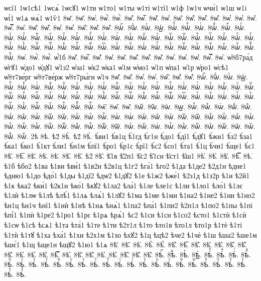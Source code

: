{ѡсї1
1ѡ1сѣ1
1ѡсѧ́
1ѡсꙋ1
ѡ1ти
ѡ1то1
ѡ1ты
ѡ1ті
ѡ1тї1
ѡ1ф
1ѡ1ч
ѡчи́1
ѡ1ш
ѡ1і
ѡі́1
ѡ1ѧ
ѡѧ́1
ѡ1ѷ1
8ѡ҃.
8ѡ҄.
8ѡ҅.
8ѡ҅̀.
8ѡ҅́.
8ѡ҅̂.
8ѡ҅̅.
8ѡ҅̆.
8ѡ҅̇.
8ѡ҅̈.
8ѡ҅̋.
8ѡ҅̏.
8ѡ҅̑.
8ѡ҅̓.
8ѡ҅̔.
8ѡ҅̾.
8ѡ҅̿.
8ѡ҅͘.
8ѡ҅҃.
8ѡ҅҄.
8ѡ҅҅.
8ѡ҅҆.
8ѡ҅҇.
8ѡ҅᷀.
8ѡ҅᷁.
8ѡ҅᷶.
8ѡ᷷҅.
8ѡ᷸҅.
8ѡ᷹҅.
8ѡ҅ⷠ.
8ѡ҅ⷡ.
8ѡ҅ⷢ.
8ѡ҅ⷣ.
8ѡ҅ⷤ.
8ѡ҅ⷥ.
8ѡ҅ⷦ.
8ѡ҅ⷧ.
8ѡ҅ⷨ.
8ѡ҅ⷩ.
8ѡ҅ⷪ.
8ѡ҅ⷫ.
8ѡ҅ⷬ.
8ѡ҅ⷭ.
8ѡ҅ⷮ.
8ѡ҅ⷯ.
8ѡ҅ⷰ.
8ѡ҅ⷱ.
8ѡ҅ⷲ.
8ѡ҅ⷳ.
8ѡ҅ⷴ.
8ѡ҅ⷵ.
8ѡ҅ⷶ.
8ѡ҅ⷷ.
8ѡ҅ⷸ.
8ѡ҅ⷹ.
8ѡ҅ⷺ.
8ѡ҅ⷻ.
8ѡ҅ⷼ.
8ѡ҅ⷽ.
8ѡ҅ⷾ.
8ѡ҅ⷿ.
8ѡ҅꙯.
8ѡ҅ꙴ.
8ѡ҅ꙵ.
8ѡ҅ꙶ.
8ѡ҅ꙷ.
8ѡ҅ꙸ.
8ѡ҅ꙹ.
8ѡ҅ꙺ.
8ѡ҅ꙻ.
8ѡ҅꙼.
8ѡ҅꙽.
8ѡ҅ꚞ.
8ѡ҅ꚟ.
8ѡ҆.
8ѡ҆̀.
8ѡ҆́.
ѡ҆́1б
8ѡ҆̂.
8ѡ҆̅.
8ѡ҆̆.
8ѡ҆̇.
8ѡ҆̈.
8ѡ҆̋.
8ѡ҆̏.
8ѡ҆̑.
8ѡ҆̓.
8ѡ҆̔.
8ѡ҆̾.
8ѡ҆̿.
8ѡ҆͘.
ѡ҆8б7ра́д
ѡ҆гꙋ1
ѡ҆до1
ѡ҆дꙋ1
ѡ҆1з2
ѡ҆за1
ѡ҆к2
ѡ҆ка1
ѡ҆1м
ѡ҆мо1
ѡ҆1п
ѡ҆па1
ѡ҆1р
ѡ҆ро1
ѡ҆сѣ1
ѡ҆8т7ве́рг
ѡ҆8т7ве́рж
ѡ҆8т7ры́гн
ѡ҆1ч
8ѡ҆҃.
8ѡ҆҄.
8ѡ҆҅.
8ѡ҆҆.
8ѡ҆҇.
8ѡ҆᷀.
8ѡ҆᷁.
8ѡ҆᷶.
8ѡ᷷҆.
8ѡ᷸҆.
8ѡ᷹҆.
8ѡ҆ⷠ.
8ѡ҆ⷡ.
8ѡ҆ⷢ.
8ѡ҆ⷣ.
8ѡ҆ⷤ.
8ѡ҆ⷥ.
8ѡ҆ⷦ.
8ѡ҆ⷧ.
8ѡ҆ⷨ.
8ѡ҆ⷩ.
8ѡ҆ⷪ.
8ѡ҆ⷫ.
8ѡ҆ⷬ.
8ѡ҆ⷭ.
8ѡ҆ⷮ.
8ѡ҆ⷯ.
8ѡ҆ⷰ.
8ѡ҆ⷱ.
8ѡ҆ⷲ.
8ѡ҆ⷳ.
8ѡ҆ⷴ.
8ѡ҆ⷵ.
8ѡ҆ⷶ.
8ѡ҆ⷷ.
8ѡ҆ⷸ.
8ѡ҆ⷹ.
8ѡ҆ⷺ.
8ѡ҆ⷻ.
8ѡ҆ⷼ.
8ѡ҆ⷽ.
8ѡ҆ⷾ.
8ѡ҆ⷿ.
8ѡ҆꙯.
8ѡ҆ꙴ.
8ѡ҆ꙵ.
8ѡ҆ꙶ.
8ѡ҆ꙷ.
8ѡ҆ꙸ.
8ѡ҆ꙹ.
8ѡ҆ꙺ.
8ѡ҆ꙻ.
8ѡ҆꙼.
8ѡ҆꙽.
8ѡ҆ꚞ.
8ѡ҆ꚟ.
8ѡ҇.
8ѡ᷀.
8ѡ᷁.
8ѡ᷶.
8ѡ᷷.
8ѡ᷸.
8ѡ᷹.
8ѡⷠ.
8ѡⷡ.
8ѡⷢ.
8ѡⷣ.
8ѡⷤ.
8ѡⷥ.
8ѡⷦ.
8ѡⷧ.
8ѡⷨ.
8ѡⷩ.
8ѡⷪ.
8ѡⷫ.
8ѡⷬ.
8ѡⷭ.
8ѡⷮ.
8ѡⷯ.
8ѡⷰ.
8ѡⷱ.
8ѡⷲ.
8ѡⷳ.
8ѡⷴ.
8ѡⷵ.
8ѡⷶ.
8ѡⷷ.
8ѡⷸ.
8ѡⷹ.
8ѡⷺ.
8ѡⷻ.
8ѡⷼ.
8ѡⷽ.
8ѡⷾ.
8ѡⷿ.
8ѡ꙯.
8ѡꙴ.
8ѡꙵ.
8ѡꙶ.
8ѡꙷ.
8ѡꙸ.
8ѡꙹ.
8ѡꙺ.
8ѡꙻ.
8ѡ꙼.
8ѡ꙽.
8ѡꚞ.
8ѡꚟ.
2ѣ
8ѣ.
ѣ2̀
8ѣ̀.
ѣ2́
8ѣ́.
ѣ́ви1
ѣ́в1ц
ѣ́1гд
ѣ́г1н
ѣ́до1
ѣ́дї1
ѣ́дꙋ1
ѣ́жи1
ѣ́з2
ѣ́за1
ѣ́ка1
ѣ́ко1
ѣ́1кт
ѣ́ли1
ѣ́н1м
ѣ́пї1
ѣ́ро1
ѣ́р1с
ѣ́рї1
ѣ́с2
ѣ́со1
ѣ́та1
ѣ́1ц
ѣ́чи1
ѣ́ще1
ѣ́є1
8ѣ̂.
8ѣ̅.
8ѣ̆.
8ѣ̇.
8ѣ̈.
8ѣ̋.
8ѣ̏.
ѣ2̑
8ѣ̑.
ѣ̑1в
ѣ̑2п1
ѣ̑с2
ѣ̑1сн
ѣ̑ст1
ѣ̑ш1
8ѣ̓.
8ѣ̔.
8ѣ̾.
8ѣ̿.
8ѣ͘.
ѣ1б
ѣбо2
ѣ1ва
ѣ1ви
ѣви́1
ѣ1в2н
ѣ2в1ц
ѣ1г2
ѣга́1
ѣго2
ѣ1да
ѣ1де2
ѣ2д1н
ѣдне1
ѣдню1
ѣ1до
ѣдо́1
ѣ1ды
ѣ1дї2
ѣдѡ2
ѣ1дꙋ2
ѣ1е
ѣ1ж2
ѣже́1
ѣ2з1д
ѣ1з2р
ѣ1и
ѣ2й1
ѣ1к
ѣка2
ѣки́1
ѣ2к1н
ѣко́1
ѣкꙋ2
ѣ1ла2
ѣла́1
ѣ1ле
ѣле1с
ѣ1ли
ѣ1ло1
ѣло́1
ѣ1лє
ѣ1лѝ
ѣ1лѡ
ѣ1лѣ
ѣлѣ́1
ѣ1лѧ
ѣлѧ́1
ѣ1лꙋ2
ѣ1ма
ѣ1ме
ѣ1ми
ѣ1на2
ѣ1не2
ѣ1ни
ѣ1но2
ѣн1ц
ѣн1ч
ѣнї1
ѣ1нѝ
ѣ1нѣ
ѣ1нѧ
ѣнѧ́1
ѣ1па2
ѣпа́1
ѣ1пи2
ѣ2п1л
ѣ1по2
ѣ1пы
ѣ1пі
ѣпі́1
ѣ1пѝ
ѣ1ре2
ѣ1ро1
ѣ1рє
ѣ1рѧ
ѣрѧ́1
ѣс2
ѣ1си
ѣ1сн
ѣ1со2
ѣсто1
ѣ1стѝ
ѣ1сѝ
ѣ1сѡ
ѣ1сѣ
ѣсѧ1
ѣ1та
ѣта́1
ѣ1те
ѣ1ти
ѣ2т1л
ѣ1то
ѣто1в
ѣто1л
ѣто1р
ѣ1тѐ
ѣ1ті
ѣ1тѝ
ѣ1тꙋ
ѣ1ха
ѣха́1
ѣ1хи
ѣ2х1м
ѣ1хо
ѣхꙋ2
ѣ1ц
ѣцѣ2
ѣче2
ѣ1чѐ
ѣ1ш
ѣша2
ѣше1м
ѣшє́1
ѣ1щ
ѣще1н
ѣщꙋ2
ѣ1ю1
ѣ1ѧ
8ѣ҃.
8ѣ҄.
8ѣ҅.
8ѣ҅̀.
8ѣ҅́.
8ѣ҅̂.
8ѣ҅̅.
8ѣ҅̆.
8ѣ҅̇.
8ѣ҅̈.
8ѣ҅̋.
8ѣ҅̏.
8ѣ҅̑.
8ѣ҅̓.
8ѣ҅̔.
8ѣ҅̾.
8ѣ҅̿.
8ѣ҅͘.
8ѣ҅҃.
8ѣ҅҄.
8ѣ҅҅.
8ѣ҅҆.
8ѣ҅҇.
8ѣ҅᷀.
8ѣ҅᷁.
8ѣ҅᷶.
8ѣ᷷҅.
8ѣ᷸҅.
8ѣ᷹҅.
8ѣ҅ⷠ.
8ѣ҅ⷡ.
8ѣ҅ⷢ.
8ѣ҅ⷣ.
8ѣ҅ⷤ.
8ѣ҅ⷥ.
8ѣ҅ⷦ.
8ѣ҅ⷧ.
8ѣ҅ⷨ.
8ѣ҅ⷩ.
8ѣ҅ⷪ.
8ѣ҅ⷫ.
8ѣ҅ⷬ.
8ѣ҅ⷭ.
8ѣ҅ⷮ.
8ѣ҅ⷯ.
8ѣ҅ⷰ.
8ѣ҅ⷱ.
8ѣ҅ⷲ.
8ѣ҅ⷳ.
8ѣ҅ⷴ.
8ѣ҅ⷵ.
8ѣ҅ⷶ.
8ѣ҅ⷷ.
8ѣ҅ⷸ.
8ѣ҅ⷹ.
}
